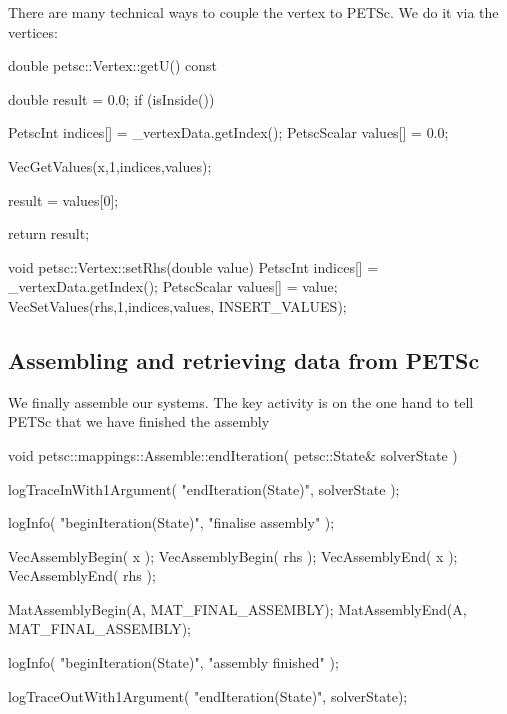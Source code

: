 \noindent
There are many technical ways to couple the vertex to PETSc.
We do it via the vertices:

\begin{code}
double petsc::Vertex::getU() const {
  double result = 0.0;
  if (isInside()) {
    PetscInt     indices[] = {_vertexData.getIndex()};
    PetscScalar  values[]  = {0.0};

    VecGetValues(x,1,indices,values);

    result = values[0];
  }
  return result;
}


void petsc::Vertex::setRhs(double value) {
  PetscInt     indices[] = {_vertexData.getIndex()};
  PetscScalar  values[]  = {value};
  VecSetValues(rhs,1,indices,values, INSERT_VALUES);
}
\end{code}



\subsection{Assembling and retrieving data from PETSc}

We finally assemble our systems. The key activity is on the one hand to tell
PETSc that we have finished the assembly

\begin{code}
void petsc::mappings::Assemble::endIteration(
  petsc::State&  solverState
) {
  logTraceInWith1Argument( "endIteration(State)", solverState );

  logInfo( "beginIteration(State)", "finalise assembly" );

  VecAssemblyBegin( x );
  VecAssemblyBegin( rhs );
  VecAssemblyEnd( x );
  VecAssemblyEnd( rhs );

  MatAssemblyBegin(A, MAT_FINAL_ASSEMBLY);
  MatAssemblyEnd(A, MAT_FINAL_ASSEMBLY);

  logInfo( "beginIteration(State)", "assembly finished" );

  logTraceOutWith1Argument( "endIteration(State)", solverState);
}
\end{code}

